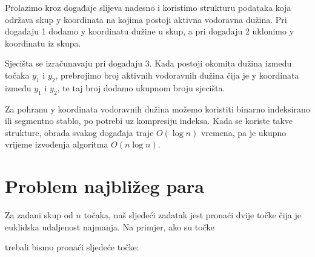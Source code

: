 Prolazimo kroz događaje slijeva nadesno
i koristimo strukturu podataka koja održava skup
y koordinata na kojima postoji aktivna vodoravna dužina.
Pri događaju 1 dodamo y koordinatu dužine
u skup, a pri događaju 2 uklonimo
y koordinatu iz skupa.

Sjecišta se izračunavaju pri događaju 3.
Kada postoji okomita dužina između točaka
$y_1$ i $y_2$, prebrojimo broj aktivnih
vodoravnih dužina čija je y koordinata između
$y_1$ i $y_2$, te taj broj dodamo ukupnom
broju sjecišta.

Za pohranu y koordinata vodoravnih dužina
možemo koristiti binarno indeksirano ili segmentno stablo,
po potrebi uz kompresiju indeksa.
Kada se koriste takve strukture, obrada svakog događaja
traje $O(\log n)$ vremena, pa je ukupno vrijeme
izvođenja algoritma $O(n \log n)$.

\section{Problem najbližeg para}


Za zadani skup od $n$ točaka, naš sljedeći zadatak jest
pronaći dvije točke čija je euklidska udaljenost najmanja.
Na primjer, ako su točke
\begin{center}
\end{center}
\begin{samepage}
trebali bismo pronaći sljedeće točke:
\begin{center}
\end{center}
\end{samepage}


